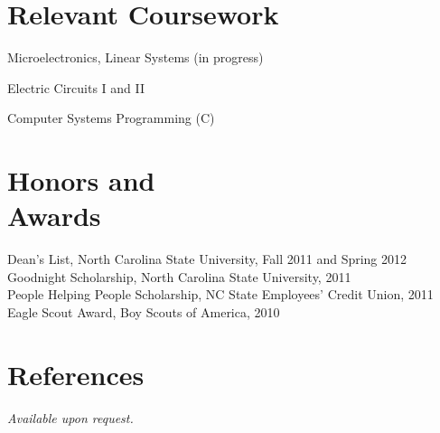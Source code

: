 \documentclass[margin,line,letterpaper]{resume}
\begin{document}
\begin{resume}
    \section{\mysidestyle Relevant Coursework}

    \begin{list2}
    \item Microelectronics, Linear Systems (in progress)
    \item Electric Circuits I and II
    \item Computer Systems Programming (C)
    \end{list2}\vspace{-1.5mm}


    \section{\mysidestyle Honors and\\Awards} 

    Dean's List, North Carolina State University, Fall 2011 and Spring 2012   \vspace{-8mm}\\%

    Goodnight Scholarship, North Carolina State University, 2011              \vspace{-8mm}\\%

    People Helping People Scholarship, NC State Employees' Credit Union, 2011 \vspace{-8mm}\\%

    Eagle Scout Award, Boy Scouts of America, 2010

    \section{\mysidestyle References} 
    {\sl Available upon request.}




\end{resume}
\end{document}
